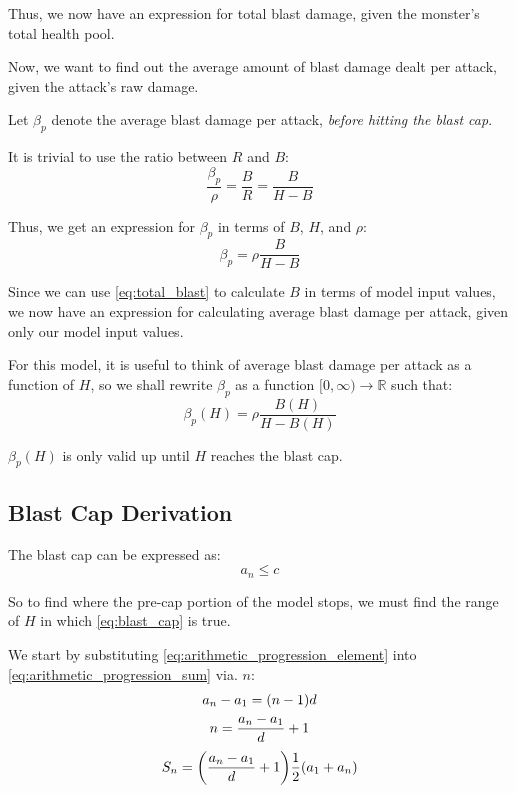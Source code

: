 \documentclass{article}
\begin{document}
Thus, we now have an expression for total blast damage, given the monster's total health pool.

Now, we want to find out the average amount of blast damage dealt per attack, given the attack's raw damage.

Let $\beta_p$ denote the average blast damage per attack, \textit{before hitting the blast cap}.

It is trivial to use the ratio between $R$ and $B$:
\begin{equation}
    \frac{\beta_p}{\rho}
    = \frac{B}{R}
    = \frac{B}{H - B} 
\end{equation}

Thus, we get an expression for $\beta_p$ in terms of $B$, $H$, and $\rho$:
\begin{equation}
    \beta_p = \rho \frac{B}{H - B}
\end{equation}

Since we can use \eqref{eq:total_blast} to calculate $B$ in terms of model input values, we now have an expression for calculating average blast damage per attack, given only our model input values.

For this model, it is useful to think of average blast damage per attack as a function of $H$, so we shall rewrite $\beta_p$ as a function $[0, \infty) \to \mathbb{R}$ such that:
\begin{equation}
    \beta_p (H) = \rho \frac{B(H)}{H - B(H)}
\end{equation}

$\beta_p (H)$ is only valid up until $H$ reaches the blast cap.


\subsection{Blast Cap Derivation}%
\label{sub:model_blast_cap_derivation}

The blast cap can be expressed as:
\begin{equation}
    a_n \le c
    \label{eq:blast_cap}
\end{equation}

So to find where the pre-cap portion of the model stops, we must find the range of $H$ in which \eqref{eq:blast_cap} is true.

We start by substituting \eqref{eq:arithmetic_progression_element} into \eqref{eq:arithmetic_progression_sum} via. $n$:
\begin{gather}
    a_n - a_1 = \parens*{n - 1} d \\
    n = \frac{a_n - a_1}{d} + 1
\end{gather}
\begin{equation}
    S_n = \parens*{\frac{a_n - a_1}{d} + 1} \frac{1}{2} \parens*{a_1 + a_n}
    \label{eq:blast_cap_work1}
\end{equation}
\end{document}
